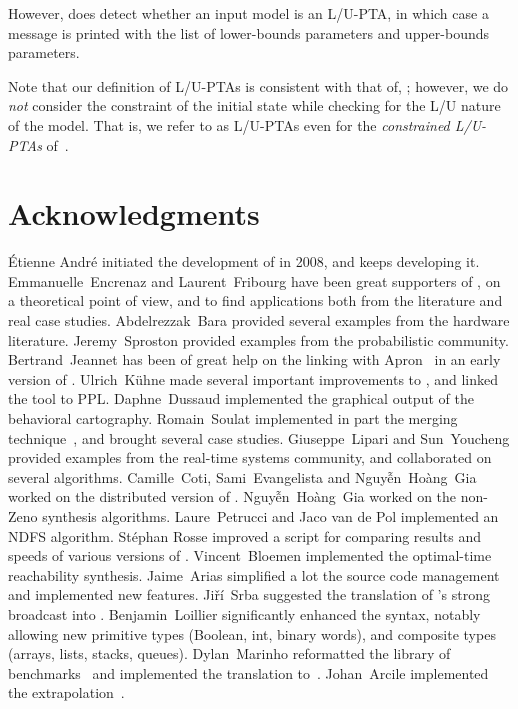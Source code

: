 However, \imitator{} does detect whether an input model is an L/U-PTA, in which case a message is printed with the list of lower-bounds parameters and upper-bounds parameters.

\begin{remark}
	Note that our definition of L/U-PTAs is consistent with that of, \eg{} \cite{BlT09}; however, we do \emph{not} consider the constraint of the initial state while checking for the L/U nature of the model.
	That is, we refer to as L/U-PTAs even for the \emph{constrained L/U-PTAs} of~\cite{BlT09}.
\end{remark}




\chapter{Acknowledgments}

\sloppy
\'Etienne André initiated the development of \imitator{} in 2008, and keeps developing it.
Emmanuelle~Encrenaz and Laurent~Fribourg have been great supporters of \imitator{}, on a theoretical point of view, and to find applications both from the literature and real case studies.
Abdelrezzak~Bara provided several examples from the hardware literature.
Jeremy~Sproston provided examples from the probabilistic community.
Bertrand~Jeannet has been of great help on the linking with Apron~\cite{JM09} in an early version of \imitator{}.
Ulrich~K\"uhne made several important improvements to \imitator{}, and linked the tool to PPL.
Daphne~Dussaud implemented the graphical output of the behavioral cartography.
Romain~Soulat implemented in part the merging technique~\cite{AFS13atva}, and brought several case studies.
Giuseppe~Lipari and Sun~Youcheng provided examples from the real-time systems community, and collaborated on several algorithms.
Camille~Coti, Sami~Evangelista and Nguy\~{ê}n~Hoàng~Gia worked on the distributed version of \imitator{}.
Nguy\~{ê}n~Hoàng~Gia worked on the non-Zeno synthesis algorithms.
Laure~Petrucci and Jaco van de Pol implemented an NDFS algorithm.
%
Stéphan Rosse improved a script for comparing results and speeds of various versions of \imitator{}.
%
Vincent~Bloemen implemented the optimal-time reachability synthesis.
%
Jaime~Arias simplified a lot the source code management and implemented new features.
%
Jiří~Srba suggested the translation of \imitator{}'s strong broadcast into \uppaal{}.
%
Benjamin~Loillier significantly enhanced the syntax, notably allowing new primitive types (Boolean, int, binary words), and composite types (arrays, lists, stacks, queues).
%
Dylan~Marinho reformatted the library of benchmarks~\cite{AMP21} and implemented the translation to~\jani{}.
%
Johan~Arcile implemented the extrapolation~\cite{AA22}.

